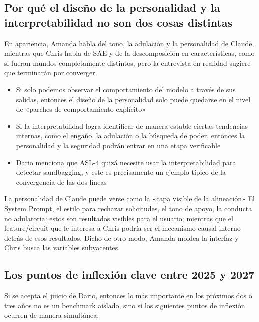 \subsection{Por qué el diseño de la personalidad y la interpretabilidad no son dos cosas distintas}

En apariencia, Amanda habla del tono, la adulación y la personalidad de Claude, mientras que Chris habla de SAE y de la descomposición en características, como si fueran mundos completamente distintos; pero la entrevista en realidad sugiere que terminarán por converger.

\begin{itemize}
    \item Si solo podemos observar el comportamiento del modelo a través de sus salidas, entonces el diseño de la personalidad solo puede quedarse en el nivel de «parches de comportamiento explícito»
    \item Si la interpretabilidad logra identificar de manera estable ciertas tendencias internas, como el engaño, la adulación o la búsqueda de poder, entonces la personalidad y la seguridad podrán entrar en una etapa verificable
    \item Dario menciona que ASL-4 quizá necesite usar la interpretabilidad para detectar sandbagging, y este es precisamente un ejemplo típico de la convergencia de las dos líneas
\end{itemize}

\begin{knowledgebox}{La personalidad de Claude puede verse como la «capa visible de la alineación»}
El System Prompt, el estilo para rechazar solicitudes, el tono de apoyo, la conducta no adulatoria: estos son resultados visibles para el usuario; mientras que el feature/circuit que le interesa a Chris podría ser el mecanismo causal interno detrás de esos resultados. Dicho de otro modo, Amanda moldea la interfaz y Chris busca las variables subyacentes.
\end{knowledgebox}

\subsection{Los puntos de inflexión clave entre 2025 y 2027}

Si se acepta el juicio de Dario, entonces lo más importante en los próximos dos o tres años no es un benchmark aislado, sino si los siguientes puntos de inflexión ocurren de manera simultánea:


